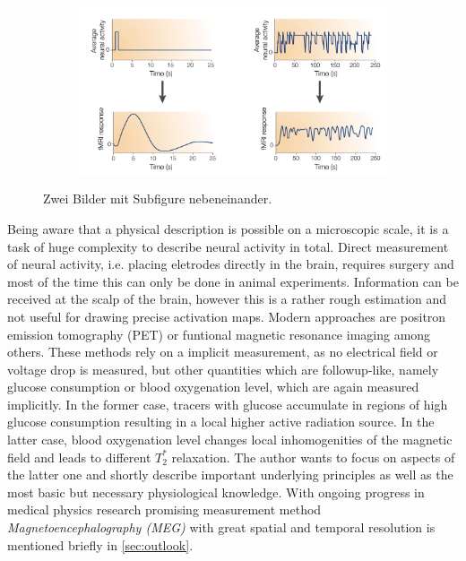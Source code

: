 \documentclass[a4paper]{scrartcl}
\begin{document}
\begin{figure}[hbt]
\begin{subfigure}[l]{0.35\textwidth}
  \end{subfigure}
  \begin{subfigure}[r]{0.6\textwidth}
    \includegraphics[width = \textwidth]{pictures/signalProcessing.png}
    \end{subfigure}
  \caption{Zwei Bilder mit Subfigure nebeneinander.}
\end{figure}
Being aware that a physical description is possible on a microscopic scale, it is a task of huge complexity to describe neural activity in total.
Direct measurement of neural activity, i.e. placing eletrodes directly in the brain, requires surgery and most of the time this can only be done in animal experiments. 
Information can be received at the scalp of the brain, however this is a rather rough estimation and not useful for drawing precise activation maps.\cite[6]{buxton}
Modern approaches are positron emission tomography (PET) or funtional magnetic resonance imaging among others.
These methods rely on a implicit measurement, as no electrical field or voltage drop is measured, but other quantities which are followup-like, namely glucose consumption or blood oxygenation level, which are again measured implicitly.
In the former case, tracers with glucose accumulate in regions of high glucose consumption resulting in a local higher active radiation source.
In the latter case, blood oxygenation level changes local inhomogenities of the magnetic field and leads to different \textit{$T_2^*$} relaxation.
The author wants to focus on aspects of the latter one and shortly describe important underlying principles as well as the most basic but necessary physiological knowledge.
With ongoing progress in medical physics research promising measurement method \textit{Magnetoencephalography (MEG)} with great spatial and temporal resolution is mentioned briefly in \autoref{sec:outlook}. 
\end{document}
